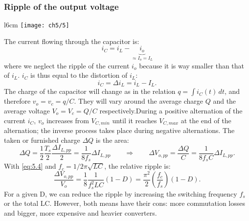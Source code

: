 		\subsubsection{Ripple of the output voltage}
			\begin{wrapfigure}[8]{l}{6cm}
			\vspace{-5mm}
			\texttt{[image: ch5/5]}
			\end{wrapfigure}	
			The current flowing through the capacitor is: 
			\begin{equation}
				i_C = i_L - \underbrace{i_o}_{\approx I_o = I_L}
			\end{equation}
			where we neglect the ripple of the current $i_o$ because it is way smaller than that of $i_L$. $i_C$ is thus equal to the distortion of $i_L$:
			\begin{equation}
				i_C = \Delta i_L = i_L -I_L.
			\end{equation}
			The charge of the capacitor will change as in the relation $q = \int i_C(t) \, dt$, and therefore $v_o = v_c = q/C$. They will vary around the average charge $Q$ and the average voltage $V_o = V_c = Q/C$ respectively.During a positive alternation of the current $i_C$, $v_o$ increases from $V_{C,min}$ until it reaches $V_{C,max}$ at the end of the alternation; the inverse process takes place during negative alternations. The taken or furnished charge $\Delta Q$ is the area: 
			\begin{equation}
				\Delta Q = \frac{1}{2}\frac{T_s}{2}\frac{\Delta I_{L,pp}}{2} = \frac{1}{8f_s}\Delta I_{L,pp} \qquad \Rightarrow \qquad \Delta V_{o,pp} = \frac{\Delta Q}{C} = \frac{1}{8f_sC}\Delta I_{L,pp}.
			\end{equation}
			With \eqref{eq:5.4} and $f_c = 1/2\pi \sqrt{LC}$, the relative ripple is: 
			\begin{equation}
				\frac{\Delta V_{o,pp}}{V_o} = \frac{1}{8}\frac{1}{f_s^2LC}(1-D) = \frac{\pi ^2}{2}\left(\frac{f_c}{f_s} \right)(1-D). 
			\end{equation}
			For a given D, we can reduce the ripple by increasing the switching frequency $f_s$ or the total LC. However, both means have their cons: more commutation losses and bigger, more expensive and heavier converters. 
			
